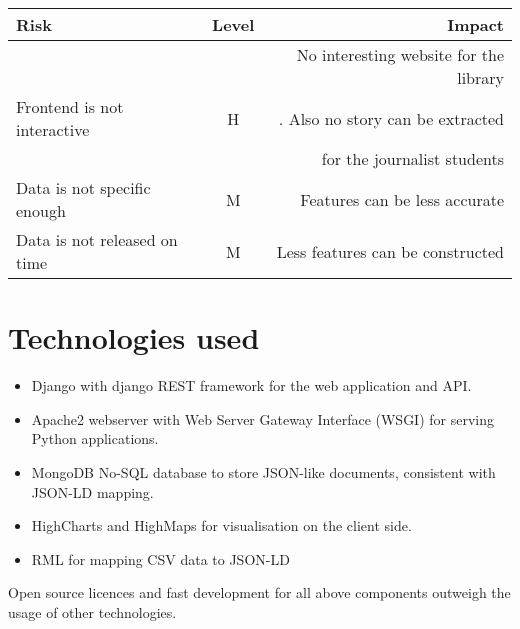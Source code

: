 \begin{center}
  \begin{tabular}{ l | c | r  }
    \hline
    Risk & Level & Impact \\ \hline
   & & No interesting website for the library\\
      Frontend is not interactive & H & . Also no story can be extracted\\
    & &  for the journalist students \\
    Data is not specific enough & M & Features can be less accurate \\
    Data is not released on time & M & Less features can be constructed\\
  \end{tabular}
\end{center}

\section{Technologies used}

\begin{itemize}
	\item Django with django REST framework for the web application and API.
	\item Apache2 webserver with Web Server Gateway Interface (WSGI) for serving Python applications.
	\item MongoDB No-SQL database to store JSON-like documents, consistent with JSON-LD mapping.
  \item HighCharts and HighMaps for visualisation on the client side.
  \item RML for mapping CSV data to JSON-LD
\end{itemize}

Open source licences and fast development for all above components outweigh the usage of other technologies.

